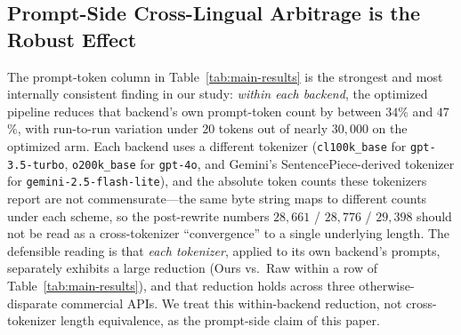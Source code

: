 \documentclass[11pt,a4paper,twocolumn]{article}
\begin{document}
\begin{table}[t]
\caption{Raw cloud baseline, the LLMLingua-2 \cite{pan2024llmlingua2} prompt-compression baseline at matched compression rate ($r{=}0.6$, with the executable \texttt{assert} block detached and re-attached verbatim so the grader is never corrupted by lossy token pruning), and our optimized middleware on OMH-Polyglot ($200$ rows $=$ $20$ algorithm clusters $\times$ $10$ style transforms; three independent runs per cell). Reported values are run means; run-level sample standard deviations are small (accuracy $\le 1.15$\,pp; total tokens $<0.5\%$ of the mean for \textit{Ours} and the LLMLingua-2 baseline alike) and are omitted from the table for compactness---they are reported in the supplementary material and should be read as a determinism probe (Section~\ref{sec:metrics}) rather than as inferential standard errors. The percentage in parentheses is the relative change in total tokens versus the same model's Raw mean; per-column relative changes for Prompt and Answer are discussed in Sections~\ref{sec:results} and \ref{sec:baselines}. OckScore is computed via Equation~\ref{eq:ockscore}. Across all three backends \textit{Ours} strictly Pareto-dominates LLMLingua-2 on the OckScore axis ($99.08 > 76.91$ on \texttt{gpt-3.5-turbo}, $98.88 > 96.56$ on \texttt{gpt-4o}, $97.54 > 33.85$ on \texttt{gemini-2.5-flash-lite}).}
\label{tab:main-results}
\end{table}

\subsection{Prompt-Side Cross-Lingual Arbitrage is the Robust Effect}
The prompt-token column in Table~\ref{tab:main-results} is the strongest and most internally consistent finding in our study: \textit{within each backend}, the optimized pipeline reduces that backend's own prompt-token count by between $34$\% and $47$\%, with run-to-run variation under $20$ tokens out of nearly $30{,}000$ on the optimized arm. Each backend uses a different tokenizer (\texttt{cl100k\_base} for \texttt{gpt-3.5-turbo}, \texttt{o200k\_base} for \texttt{gpt-4o}, and Gemini's SentencePiece-derived tokenizer for \texttt{gemini-2.5-flash-lite}), and the absolute token counts these tokenizers report are not commensurate---the same byte string maps to different counts under each scheme, so the post-rewrite numbers $28{,}661$ / $28{,}776$ / $29{,}398$ should not be read as a cross-tokenizer ``convergence'' to a single underlying length. The defensible reading is that \emph{each tokenizer}, applied to its own backend's prompts, separately exhibits a large reduction (Ours vs.\ Raw within a row of Table~\ref{tab:main-results}), and that reduction holds across three otherwise-disparate commercial APIs. We treat this within-backend reduction, not cross-tokenizer length equivalence, as the prompt-side claim of this paper.
\end{document}
